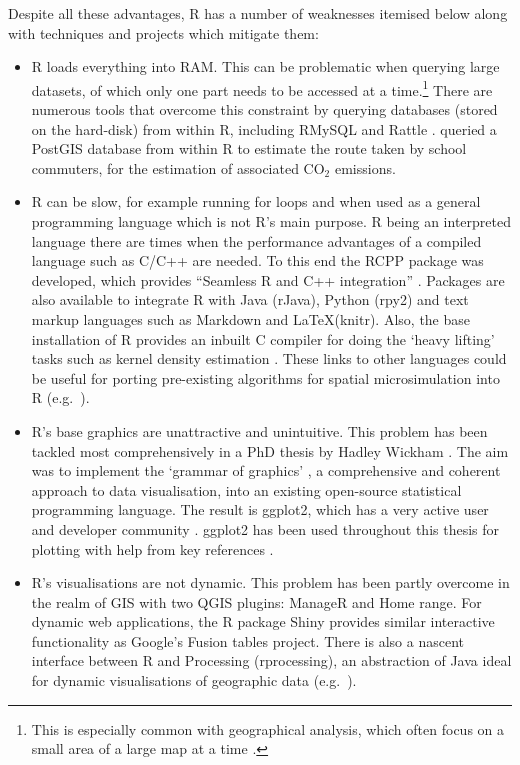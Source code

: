Despite all these advantages, R has a number of weaknesses itemised below along with techniques and projects which mitigate them:
\begin{itemize}
 \item R loads everything into RAM. This can be problematic when querying
 large datasets, of which only one part needs to be accessed at a
 time.\footnote{ This is especially common with geographical analysis, which often focus
 on a small area of a large map at a time \citep{Obe2011}.
 }
 There are numerous tools
 that overcome this constraint by querying databases (stored on the hard-disk) from within R, including
 RMySQL \citep{james2012rmysql} and Rattle \citep{Williams2009}. \citet{Singleton2013-school}
 queried a PostGIS database from within R to estimate the route taken by school
 commuters, for the estimation of associated CO$_2$ emissions.
 \item R can be slow, for example running for loops and when used as a general programming
 language which is not R’s main purpose. R being an
 interpreted language there are times when the performance advantages of a compiled language such as 
 C/C++ are needed.
 To this end the RCPP package was developed, which provides
 ``Seamless R and C++ integration''  \citep{eddelbuettel2011rcpp}. Packages are also available
 to integrate R with Java (rJava), Python (rpy2) and text markup languages such as Markdown and
 \LaTeX (knitr). Also, the base installation of R provides an inbuilt C compiler for doing the
 `heavy lifting' tasks such as kernel density estimation \citep{peng2002introduction}.
 These links to other languages could be useful for porting pre-existing algorithms
 for spatial microsimulation into R (e.g.~\citealp{Williamson2007, Ballas2007simb}).
 \item R's base graphics are unattractive and unintuitive. This problem has been
 tackled most comprehensively in a PhD thesis by Hadley Wickham \citep{Wickham2008}.
 The aim was to implement the `grammar of graphics' \citep{wilkinson2005grammar},
 a comprehensive and coherent approach to data visualisation, into an existing
 open-source statistical programming language. The result is ggplot2,
 which has a very active user and developer community \citep{wickham2011ggplot2}.
 ggplot2 has been used throughout this thesis for plotting with help from key
 references \citep{wickham2011ggplot2, chang2012r}.
 \item R's visualisations are not dynamic. This problem has been partly
 overcome in the realm  of GIS with two QGIS plugins: ManageR and Home range.
 For dynamic web applications, the R package Shiny provides similar interactive
 functionality as Google's Fusion tables project. There is also a nascent
 interface between R and Processing (rprocessing), an abstraction of Java
 ideal for dynamic
 visualisations of geographic data (e.g.~\citealp{wood2010visualisation}).
\end{itemize}


